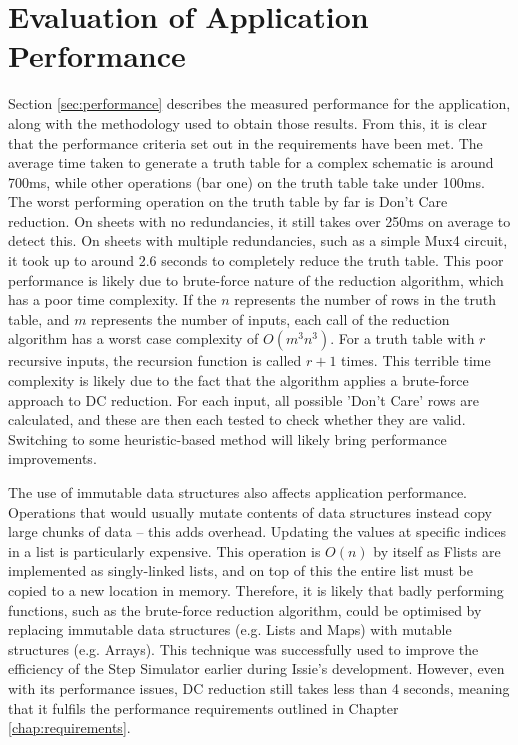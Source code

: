 \section{Evaluation of Application Performance}
Section \ref{sec:performance} describes the measured performance for the application, along with the methodology used to obtain those results. From this, it is clear that the performance criteria set out in the requirements have been met. The average time taken to generate a truth table for a complex schematic is around 700ms, while other operations (bar one) on the truth table take under 100ms. The worst performing operation on the truth table by far is Don't Care reduction. On sheets with no redundancies, it still takes over 250ms on average to detect this. On sheets with multiple redundancies, such as a simple Mux4 circuit, it took up to around 2.6 seconds to completely reduce the truth table. This poor performance is likely due to brute-force nature of the reduction algorithm, which has a poor time complexity. If the $n$ represents the number of rows in the truth table, and $m$ represents the number of inputs, each call of the reduction algorithm has a worst case complexity of $O(m^3n^3)$. For a truth table with $r$ recursive inputs, the recursion function is called $r+1$ times. This terrible time complexity is likely due to the fact that the algorithm applies a brute-force approach to DC reduction. For each input, all possible 'Don't Care' rows are calculated, and these are then each tested to check whether they are valid. Switching to some heuristic-based method will likely bring performance improvements. 

The use of immutable data structures also affects application performance. Operations that would usually mutate contents of data structures instead copy large chunks of data -- this adds overhead. Updating the values at specific indices in a list is particularly expensive. This operation is $O(n)$ by itself as F\fsharp lists are implemented as singly-linked lists, and on top of this the entire list must be copied to a new location in memory. Therefore, it is likely that badly performing functions, such as the brute-force reduction algorithm, could be optimised by replacing immutable data structures (e.g. Lists and Maps) with mutable structures (e.g. Arrays). This technique was successfully used to improve the efficiency of the Step Simulator earlier during Issie's development.  However, even with its performance issues, DC reduction still takes less than 4 seconds, meaning that it fulfils the performance requirements outlined in Chapter \ref{chap:requirements}.

